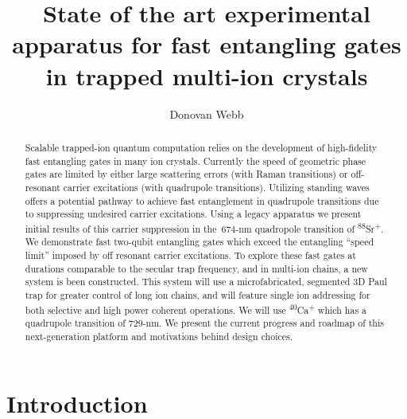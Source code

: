 \documentclass[12pt]{iopart}
\begin{document}
\title[]{State of the art experimental apparatus for fast entangling gates in trapped multi-ion crystals}

\author{Donovan Webb}

\address{Department of Physics,
University of Oxford}

\begin{abstract}

    Scalable trapped-ion quantum computation relies on the development
    of high-fidelity fast entangling gates in many ion crystals.
    Currently the speed of geometric phase gates are limited by either large
    scattering errors (with Raman transitions) or off-resonant carrier
    excitations (with quadrupole transitions).
    Utilizing standing waves offers a potential pathway to achieve
    fast entanglement in quadrupole transitions due to suppressing
    undesired carrier excitations.
    Using a legacy apparatus we present initial results of this
    carrier suppression in the~$674$-nm quadropole transition of
    \textsuperscript{88}Sr\textsuperscript{+}. We demonstrate
    fast two-qubit entangling gates which exceed the entangling ``speed
    limit'' imposed by off resonant carrier excitations.
    To explore these fast gates at durations comparable to the secular
    trap frequency, and in multi-ion chains, a new system is been
    constructed. This system will use a microfabricated, segmented 3D
    Paul trap for greater control of long ion chains, and will feature
    single ion addressing for both selective and high power coherent
    operations. We will use \textsuperscript{40}Ca\textsuperscript{+}
    which has a quadrupole transition of $729$-nm. We present the
    current progress and roadmap of this next-generation platform and
    motivations behind design choices.

\end{abstract}

\section{Introduction}

\end{document}
